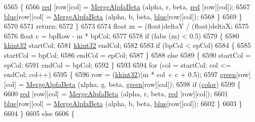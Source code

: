 \begin{DoxyCode}
6565       \{
6566         \hyperlink{class_k_k_b_1_1_raster_a7fd39e0463c8477d0d0d26e11126d285}{red} [row][col] = \hyperlink{_raster_8cpp_a35cd27498a34528ebe070556016152f5}{MergeAlpfaBeta} (alpha, r, beta, \hyperlink{class_k_k_b_1_1_raster_a7fd39e0463c8477d0d0d26e11126d285}{red} [row][col]);
6567         \hyperlink{class_k_k_b_1_1_raster_a0265be7ea30f5b1f9d6310a79bee868b}{blue}[row][col] = \hyperlink{_raster_8cpp_a35cd27498a34528ebe070556016152f5}{MergeAlpfaBeta} (alpha, b, beta, \hyperlink{class_k_k_b_1_1_raster_a0265be7ea30f5b1f9d6310a79bee868b}{blue}[row][col]);
6568       \}
6569     \}
6570 
6571     \textcolor{keywordflow}{return};
6572   \}
6573 
6574   \textcolor{keywordtype}{float}  m = (float)deltaY / (\textcolor{keywordtype}{float})deltaX;
6575 
6576   \textcolor{keywordtype}{float}  c = bpRow - m * bpCol;
6577 
6578   \textcolor{keywordflow}{if}  (fabs (m) < 0.5)
6579   \{
6580     \hyperlink{namespace_k_k_b_a8fa4952cc84fda1de4bec1fbdd8d5b1b}{kkint32}  startCol;
6581     \hyperlink{namespace_k_k_b_a8fa4952cc84fda1de4bec1fbdd8d5b1b}{kkint32}  endCol;
6582 
6583     \textcolor{keywordflow}{if}  (bpCol < epCol)
6584     \{
6585       startCol = bpCol;
6586       endCol   = epCol;
6587     \}
6588     \textcolor{keywordflow}{else}
6589     \{
6590       startCol = epCol;
6591       endCol   = bpCol;
6592     \}
6593 
6594     \textcolor{keywordflow}{for}  (col = startCol;  col <= endCol;  col++)
6595     \{
6596       row = (\hyperlink{namespace_k_k_b_a8fa4952cc84fda1de4bec1fbdd8d5b1b}{kkint32})(m * col + c + 0.5);
6597       \hyperlink{class_k_k_b_1_1_raster_a2d2238911145488e226cd2e34fc8448c}{green}[row][col] = \hyperlink{_raster_8cpp_a35cd27498a34528ebe070556016152f5}{MergeAlpfaBeta} (alpha, g, beta, \hyperlink{class_k_k_b_1_1_raster_a2d2238911145488e226cd2e34fc8448c}{green}[row][col]);
6598       \textcolor{keywordflow}{if}  (\hyperlink{class_k_k_b_1_1_raster_a482384d89cc53fa4f36276307c746854}{color})
6599       \{
6600         \hyperlink{class_k_k_b_1_1_raster_a7fd39e0463c8477d0d0d26e11126d285}{red} [row][col] = \hyperlink{_raster_8cpp_a35cd27498a34528ebe070556016152f5}{MergeAlpfaBeta} (alpha, r, beta, \hyperlink{class_k_k_b_1_1_raster_a7fd39e0463c8477d0d0d26e11126d285}{red} [row][col]);
6601         \hyperlink{class_k_k_b_1_1_raster_a0265be7ea30f5b1f9d6310a79bee868b}{blue}[row][col] = \hyperlink{_raster_8cpp_a35cd27498a34528ebe070556016152f5}{MergeAlpfaBeta} (alpha, b, beta, \hyperlink{class_k_k_b_1_1_raster_a0265be7ea30f5b1f9d6310a79bee868b}{blue}[row][col]);
6602       \}
6603     \}
6604   \}
6605   \textcolor{keywordflow}{else}
6606   \{

\end{DoxyCode}
